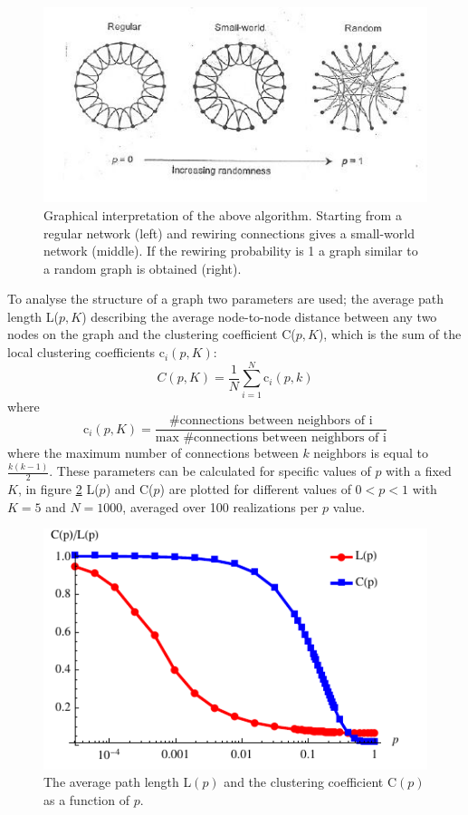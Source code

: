 \documentclass[10pt,a4paper]{article}
\begin{document}
\begin{figure}[H]
  \centering
  \includegraphics[scale=1.0]{smallworld.jpg}
  \caption{Graphical interpretation of the above algorithm. Starting from a regular network (left) and rewiring connections gives a small-world network (middle). If the rewiring probability is 1 a graph similar to a random graph is obtained (right).}
  \label{fig:smallworld}
\end{figure}

\noindent To analyse the structure of a graph two parameters are used; the average path length L($p,K$) describing the average node-to-node distance between any two nodes on the graph and the clustering coefficient C($p,K$), which is the sum of the local clustering coefficients c$_{i}(p,K)$:
\begin{equation}
C(p,K) = \frac{1}{N} \sum_{i = 1}^{N} \text{c}_{i}(p,k)
\end{equation}
where
\begin{equation}
\text{c}_{i}(p,K) = \frac{\text{\# connections between neighbors of i}}{\text{max \# connections between neighbors of i}}
\end{equation}
where the maximum number of connections between $k$ neighbors is equal to $\frac{k(k-1)}{2}$. These parameters can be calculated for specific values of $p$ with a fixed $K$, in figure \ref{fig:lpcp} L($p$) and C($p$) are plotted for different values of $0 < p < 1$ with $K = 5$ and $N = 1000$, averaged over 100 realizations per $p$ value.\\

\begin{figure}[H]
  \centering
  \includegraphics[scale=1.1]{lpcp.pdf}
  \caption{The average path length L$(p)$ and the clustering coefficient C$(p)$ as a function of $p$.}
  \label{fig:lpcp}
\end{figure}
\end{document}
